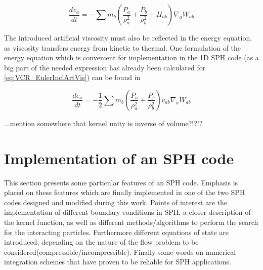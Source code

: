 \documentclass{report}
\begin{document}
\begin{equation}
\label{eq:VCR_EulerInclArtVis}
\frac{dv_{a}}{\mathit{dt}}=-\sum {m_{b}\left(\frac{P_{a}}{\rho_{a}^{2}}+\frac{P_{b}}{\rho _{b}^{2}}+\Pi _{ab}\right)\nabla_{a}W_{ab}}
\end{equation}

The introduced artificial viscosity must also be reflected in the energy equation, as viscosity transfers energy from kinetic to thermal\cite{Monaghan2005}. One formulation of the energy equation which is convenient for implementation in the 1D SPH code (as a big part of the needed expression has already been calculated for \ref{eq:VCR_EulerInclArtVis}) can be found in\cite{Liu2003}

\begin{equation}
\label{eq:ECR_EulerInclArtVis}
\frac{de_{a}}{\mathit{dt}}=-\mathit{}\frac{1}{2}\sum{m_{b}\left(\frac{P_{a}}{\rho _{a}^{2}}+\frac{P_{b}}{\rho _{b}^{2}}\right)v_{\mathit{ab}}\nabla _{a}W_{\mathit{ab}}}
\end{equation}

...mention somewhere that kernel unity is inverse of volume?!?!?

\section{Implementation of an SPH code}
This section presents some particular features of an SPH code. Emphasis is
placed on these features which are finally implemented in one of the
two SPH codes designed and modified during this work.
Points of interest are the implementation of different boundary conditions in
SPH, a closer description of the kernel function, as well as different methods/algorithms
to perform the search for the interacting particles. Furthermore different
equations of state are introduced, depending on the nature of the flow problem
to be considered(compressible/incompressible). Finally some words on numerical
integration schemes that have proven to be reliable for SPH applications.
\end{document}
